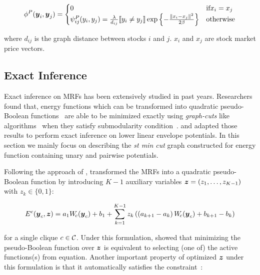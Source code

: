 \begin{align}
  \label{eq:energyfunction_pairwise}
  \phi^P(\by_i,\by_j)=
  \begin{cases}
    0 & \text{if} x_i = x_j \\
    \psi^P_{ij}(y_i, y_j) = \frac{\lambda}{d_{ij}} \ind{y_i \neq
      y_j} \exp\left\{- \frac{\|x_i - x_j\|^2}{2 \beta}\right\} &
    \text{otherwise}
  \end{cases}
\end{align}

\noindent where $d_{ij}$ is the graph distance between stocks $i$
and $j$. $x_i$ and $x_j$ are stock market price vectors.

\subsection{Exact Inference}
\label{sec:exact_inference}

Exact inference on MRFs has been extensively studied in past
years. Researchers found that, energy functions which can be
transformed into quadratic pseudo-Boolean
functions~\cite{Ishikawa:PAMI03,Ishikawa:CVPR09,Rother:CVPR09}
are able to be minimized exactly using \emph{graph-cuts} like
algorithms~\cite{Freedman:CVPR05,Hammer:1965} when they satisfy
submodularity condition~\cite{Boros:MATH02}.
 and  adapted those
results to perform exact inference on lower linear envelope
potentials. In this section we mainly focus on describing the
\emph{st min cut} graph constructed for energy function containing
unary and pairwise potentials.

Following the approach of ,
 transformed the MRFs into
a quadratic pseudo-Boolean function by introducing $K-1$
auxiliary variables ${\boldsymbol{z}} = \left(z_1, \ldots, z_{K-1}\right)$
with $z_k\in \{0,1\}$:

\begin{align}
  E^c({\boldsymbol{y}}_c, {\boldsymbol{z}}) = a_1 W_{\!c}({\boldsymbol{y}}_c) + b_1
  {}+ \sum_{k = 1}^{K-1} z_k \left( \left(a_{k+1} - a_k\right) W_{\!c}({\boldsymbol{y}}_c) + b_{k+1} - b_k \right)
  \label{eqn:binary_concave_z}
\end{align}

\noindent for a single clique $c \in {\cal C}$. Under this formulation,
 showed that minimizing
the pseudo-Boolean function over ${\boldsymbol{z}}$ is equivalent to selecting
(one of) the active functions(s) from equation. Another important
property of optimized ${\boldsymbol{z}}$ under this formulation is that it
automatically satisfies the constraint~\cite{gouldlearning}:

